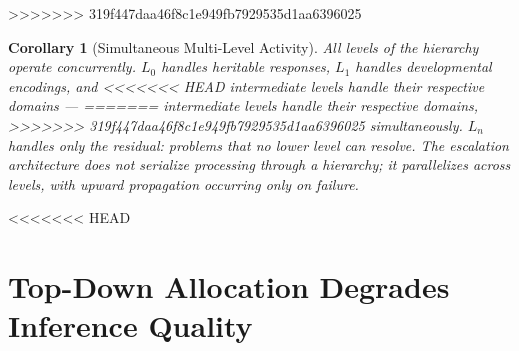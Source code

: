 \documentclass[11pt]{article}
\newtheorem{corollary}[theorem]{Corollary}
\theoremstyle{definition}
\begin{document}
>>>>>>> 319f447daa46f8c1e949fb7929535d1aa6396025
\begin{corollary}[Simultaneous Multi-Level Activity]
\label{cor:simultaneous}
All levels of the hierarchy operate concurrently. $L_0$ handles
heritable responses, $L_1$ handles developmental encodings, and
<<<<<<< HEAD
intermediate levels handle their respective domains ---
=======
intermediate levels handle their respective domains,
>>>>>>> 319f447daa46f8c1e949fb7929535d1aa6396025
simultaneously. $L_n$ handles only the residual: problems that no
lower level can resolve. The escalation architecture does not
serialize processing through a hierarchy; it parallelizes across levels,
with upward propagation occurring only on failure.
\end{corollary}

<<<<<<< HEAD
\section{Top-Down Allocation Degrades Inference Quality}
\label{sec:topdown}
\end{document}
